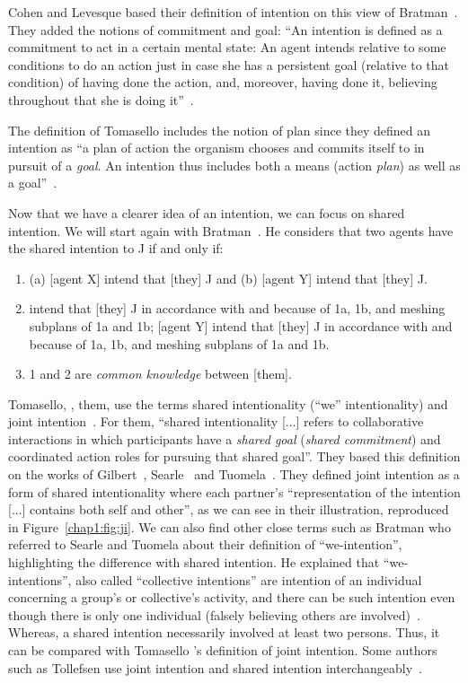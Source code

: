 \documentclass[a4paper,11pt,twoside]{StyleThese}
\begin{document}
Cohen and Levesque based their definition of intention on this view of Bratman~\cite{cohen_1990_intention}. They added the notions of commitment and goal: ``An intention is defined as a commitment to act in a certain mental state: An agent intends relative to some conditions to do an action just in case she has a persistent goal (relative to that condition) of having done the action, and, moreover, having done it, believing throughout that she is doing it''~\cite[p.~496]{cohen_1991_teamwork}. 

The definition of Tomasello \etal{} includes the notion of plan since they defined an intention as ``a plan of action the organism chooses and commits itself to in pursuit of a \emph{goal}. An intention thus includes both a means (action \emph{plan}) as well as a goal''~\cite[p.~676]{tomasello_2005_understanding}. 

Now that we have a clearer idea of an intention, we can focus on shared intention. We will start again with Bratman~\cite{bratman_1993_shared}. He considers that two agents have the shared intention to J if and only if: 
\begin{enumerate}
	\item (a) [agent X] intend that [they] J and (b) [agent Y] intend that [they] J.
	\item\relax [agent X] intend that [they] J in accordance with and because of 1a, 1b, and meshing subplans of 1a and 1b; [agent Y] intend that [they] J in accordance with and because of 1a, 1b, and meshing subplans of 1a and 1b.
	\item 1 and 2 are \emph{common knowledge} between [them].
\end{enumerate}

Tomasello, \etal{}, them, use the terms shared intentionality (``we'' intentionality) and joint intention~\cite{tomasello_2005_understanding}. For them, ``shared intentionality [...] refers to collaborative interactions in which participants have a \emph{shared goal} (\emph{shared commitment}) and coordinated action roles for pursuing that shared goal''. They based this definition on the works of Gilbert~\cite{gilbert_1989_social}, Searle~\cite{searle_1983_intentionality} and Tuomela~\cite{tuomela_1995_importance}. They defined joint intention as a form of shared intentionality where each partner's ``representation of the intention [...] contains both self and other'', as we can see in their illustration, reproduced in Figure~\ref{chap1:fig:ji}. We can also find other close terms such as Bratman who referred to Searle and Tuomela about their definition of ``we-intention'', highlighting the difference with shared intention. He explained that ``we-intentions'', also called ``collective intentions'' are intention of an individual concerning a group's or collective's activity, and there can be such intention even though there is only one individual (falsely believing others are involved)~\cite{bratman_1993_shared}. Whereas, a shared intention necessarily involved at least two persons. Thus, it can be compared with Tomasello \etal{}'s definition of joint intention. Some authors such as Tollefsen use joint intention and shared intention interchangeably~\cite{tollefsen_2005_let}.
\end{document}
